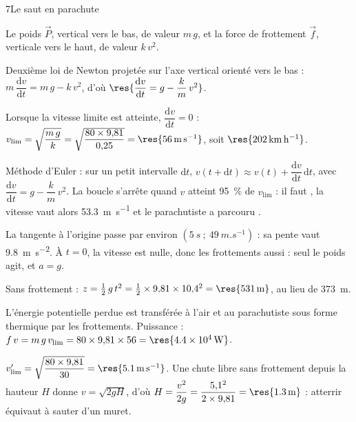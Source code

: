 \begin{corrigeBac}{7}{Le saut en parachute}
\begin{questions}
\item Le poids $\vec P$, vertical vers le bas, de valeur $m\,g$, et la force de frottement $\vec f$, verticale vers le haut, de valeur
$k\,v^2$. 
\item Deuxième loi de Newton projetée sur l'axe vertical orienté vers le bas : $m\,\dfrac{\mathrm{d}v}{\mathrm{d}t}=m\,g-k\,v^2$, d'où
$\res{\dfrac{\mathrm{d}v}{\mathrm{d}t}=g-\dfrac{k}{m}\,v^2}$. \pts{1 pt}
\item Lorsque la vitesse limite est atteinte, $\dfrac{\mathrm{d}v}{\mathrm{d}t}=0$ : $v_\mathrm{lim}=\sqrt{\dfrac{m\,g}{k}}=\sqrt{\dfrac{80\times9{,}81}{0{,}25}}=\res{\qty{56}{m.s^{-1}}}$, soit
$\res{\qty{202}{km.h^{-1}}}$. \pts{1 pt}
\item Méthode d'Euler : sur un petit intervalle $\mathrm{d}t$, $v(t+\mathrm{d}t)\approx v(t)+\dfrac{\mathrm{d}v}{\mathrm{d}t}\,\mathrm{d}t$, avec $\dfrac{\mathrm{d}v}{\mathrm{d}t}=g-\dfrac{k}{m}\,v^2$. La boucle
s'arrête quand $v$ atteint 95~\% de $v_\mathrm{lim}$ : il faut , la vitesse vaut alors \qty{53,3}{m.s^{-1}} et le parachutiste a
parcouru . 
\item La tangente à l'origine passe par environ $(\qty{5}{s}~;~\qty{49}{m.s^{-1}})$ : sa pente vaut \qty{9,8}{m.s^{-2}}. À $t=0$, la vitesse est
nulle, donc les frottements aussi : seul le poids agit, et $a=g$. 
\item Sans frottement : $z=\frac12\,g\,t^2=\frac12\times9{,}81\times10{,}4^2=\res{\qty{531}{m}}$, au lieu de \qty{373}{m}. 
\item L'énergie potentielle perdue est transférée à l'air et au parachutiste sous forme thermique par les frottements.
Puissance : $f\,v=m\,g\,v_\mathrm{lim}=80\times9{,}81\times56=\res{\qty{4,4e4}{W}}$. 
\item $v'_\mathrm{lim}=\sqrt{\dfrac{80\times9{,}81}{30}}=\res{\qty{5,1}{m.s^{-1}}}$. Une chute libre sans frottement depuis la hauteur $H$ donne
$v=\sqrt{2gH}$, d'où $H=\dfrac{v^2}{2g}=\dfrac{5{,}1^2}{2\times9{,}81}=\res{\qty{1,3}{m}}$ : atterrir équivaut à sauter d'un muret. 
\end{questions}
\end{corrigeBac}

